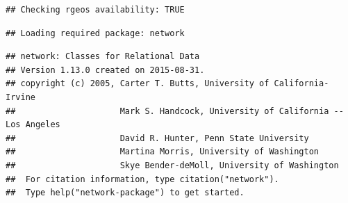 \documentclass[]{article}
\newenvironment{Shaded}{\begin{snugshade}}{\end{snugshade}}
\newcommand{\KeywordTok}[1]{\textcolor[rgb]{0.13,0.29,0.53}{\textbf{{#1}}}}
\newcommand{\DataTypeTok}[1]{\textcolor[rgb]{0.13,0.29,0.53}{{#1}}}
\newcommand{\DecValTok}[1]{\textcolor[rgb]{0.00,0.00,0.81}{{#1}}}
\newcommand{\StringTok}[1]{\textcolor[rgb]{0.31,0.60,0.02}{{#1}}}
\newcommand{\NormalTok}[1]{{#1}}
\begin{document}
\begin{verbatim}
## Checking rgeos availability: TRUE
\end{verbatim}

\begin{Shaded}
\end{Shaded}

\begin{verbatim}
## Loading required package: network
\end{verbatim}

\begin{verbatim}
## network: Classes for Relational Data
## Version 1.13.0 created on 2015-08-31.
## copyright (c) 2005, Carter T. Butts, University of California-Irvine
##                     Mark S. Handcock, University of California -- Los Angeles
##                     David R. Hunter, Penn State University
##                     Martina Morris, University of Washington
##                     Skye Bender-deMoll, University of Washington
##  For citation information, type citation("network").
##  Type help("network-package") to get started.
\end{verbatim}
\end{document}
